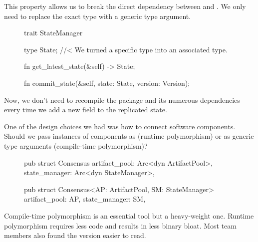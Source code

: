 \documentclass{article}
\begin{document}
This property allows us to break the direct dependency between  and .
We only need to replace the exact type with a generic type argument.

\begin{figure}
\begin{code}[good]
trait StateManager {
  type State; //< We turned a specific type into an associated type.

  fn get_latest_state(&self) -> State;

  fn commit_state(&self, state: State, version: Version);
}
\end{code}
\end{figure}

Now, we don't need to recompile the  package and its numerous dependencies every time we add a new field to the replicated state.


One of the design choices we had was how to connect software components.
Should we pass instances of components as  (runtime polymorphism) or as generic type arguments (compile-time polymorphism)?

\begin{figure}
\begin{code}[good]
pub struct Consensus {
  artifact_pool: Arc<dyn ArtifactPool>,
  state_manager: Arc<dyn StateManager>,
}
\end{code}
\end{figure}

\begin{figure}
\begin{code}[bad]
pub struct Consensus<AP: ArtifactPool, SM: StateManager> {
  artifact_pool: AP,
  state_manager: SM,
}
\end{code}
\end{figure}

Compile-time polymorphism is an essential tool but a heavy-weight one.
Runtime polymorphism requires less code and results in less binary bloat.
Most team members also found the  version easier to read.

\end{document}
